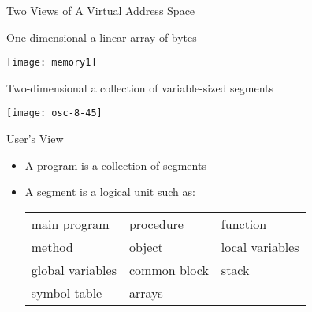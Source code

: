 \begin{frame}{Two Views of A Virtual Address Space}
  \begin{varwidth}{.45\textwidth}
    \begin{block}{One-dimensional}
      a linear array of bytes
      \begin{center}
        \texttt{[image: memory1]}
      \end{center}
    \end{block}
  \end{varwidth}\hfill
  \begin{varwidth}{.45\textwidth}
    \begin{block}{Two-dimensional}
      a collection of variable-sized segments
      \begin{center}
        \texttt{[image: osc-8-45]}
      \end{center}
    \end{block}
  \end{varwidth}
\end{frame}

\begin{frame}{User's View}
  \begin{itemize}
  \item A program is a collection of segments
  \item A segment is a logical unit such as:
    \begin{center}
      \begin{small}
        \begin{tabular}{lll}
          main program&procedure&function\\
          method&object&local variables\\
          global variables&common block&stack\\
          symbol table&arrays
        \end{tabular}
      \end{small}
    \end{center}
  \end{itemize}
\end{frame}

